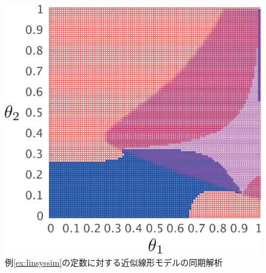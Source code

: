 \documentclass[tombow,dvipdfmx]{corona-a5}
\begin{document}
\begin{figure}[t]
{\begin{minipage}{0.32\linewidth}
    \centering
    \includegraphics[width = .85\linewidth]{figs/gam5thm}
  \end{minipage}
  \caption{例\ref{ex:linsyssim}の定数に対する近似線形モデルの同期解析}
  \label{fig:gamthm}
  }
\end{figure}
\end{document}
